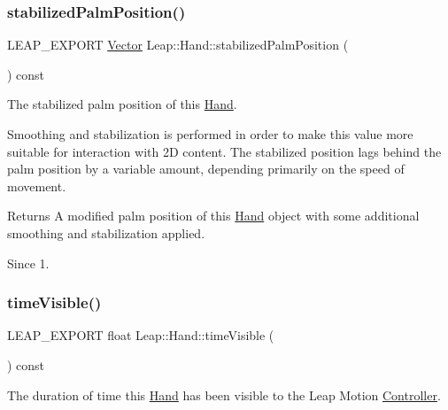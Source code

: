 \subsubsection{\texorpdfstring{stabilized\+Palm\+Position()}{stabilizedPalmPosition()}}
{\footnotesize\ttfamily L\+E\+A\+P\+\_\+\+E\+X\+P\+O\+RT \hyperlink{struct_leap_1_1_vector}{Vector} Leap\+::\+Hand\+::stabilized\+Palm\+Position (\begin{DoxyParamCaption}{ }\end{DoxyParamCaption}) const}

The stabilized palm position of this \hyperlink{class_leap_1_1_hand}{Hand}.

Smoothing and stabilization is performed in order to make this value more suitable for interaction with 2D content. The stabilized position lags behind the palm position by a variable amount, depending primarily on the speed of movement.


\begin{DoxyCodeInclude}
\end{DoxyCodeInclude}


\begin{DoxyReturn}{Returns}
A modified palm position of this \hyperlink{class_leap_1_1_hand}{Hand} object with some additional smoothing and stabilization applied. 
\end{DoxyReturn}
\begin{DoxySince}{Since}
1. 
\end{DoxySince}
\mbox{\label{class_leap_1_1_hand_aa0bfd236f2c3729ea8ae7081bcbc55b5}} 
\subsubsection{\texorpdfstring{time\+Visible()}{timeVisible()}}
{\footnotesize\ttfamily L\+E\+A\+P\+\_\+\+E\+X\+P\+O\+RT float Leap\+::\+Hand\+::time\+Visible (\begin{DoxyParamCaption}{ }\end{DoxyParamCaption}) const}

The duration of time this \hyperlink{class_leap_1_1_hand}{Hand} has been visible to the Leap Motion \hyperlink{class_leap_1_1_controller}{Controller}.


\begin{DoxyCodeInclude}
\end{DoxyCodeInclude}


